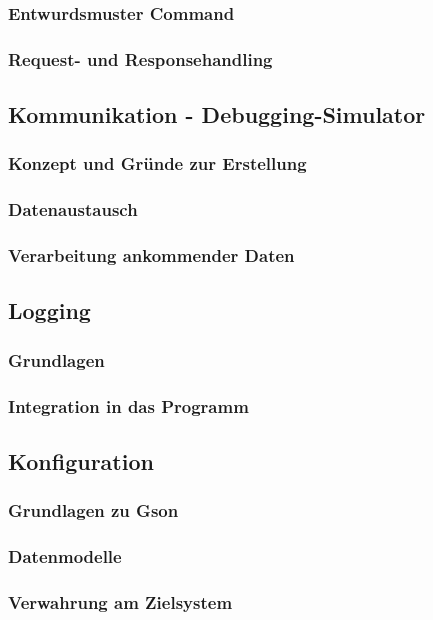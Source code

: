 \subsubsection{Entwurdsmuster Command}
\subsubsection{Request- und Responsehandling}

\subsection{Kommunikation - Debugging-Simulator}
\subsubsection{Konzept und Gründe zur Erstellung}
\subsubsection{Datenaustausch}
\subsubsection{Verarbeitung ankommender Daten}


\subsection{Logging}
\subsubsection{Grundlagen}
\subsubsection{Integration in das Programm}
\subsection{Konfiguration}
\subsubsection{Grundlagen zu Gson}
\subsubsection{Datenmodelle}
\subsubsection{Verwahrung am Zielsystem}

